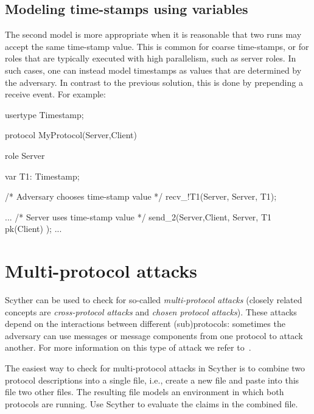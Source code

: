 \documentclass{book}
\begin{document}
\subsection{Modeling time-stamps using variables}

The second model is more appropriate when it is reasonable that two runs
may accept the same time-stamp value. This is common for coarse
time-stamps, or for roles that are typically executed with high
parallelism, such as server roles. In such cases, one can instead model
timestamps as values that are determined by the adversary.
In contrast to the previous solution, this is done by prepending a
receive event. For example:
\begin{spdl}
usertype Timestamp;

protocol MyProtocol(Server,Client) {
  role Server{
    var T1: Timestamp;

    /* Adversary chooses time-stamp value */
    recv_!T1(Server, Server, T1);

    ...
    /* Server uses time-stamp value */
    send_2(Server,Client, { Server, T1 }pk(Client) );
    ...
  }
}
\end{spdl}





\section{Multi-protocol attacks}
\label{sec:pma}

Scyther can be used to check for so-called \emph{multi-protocol attacks} (closely related concepts are \emph{cross-protocol attacks} and \emph{chosen protocol attacks}). These attacks depend on the interactions between different (sub)protocols: sometimes the adversary can use messages or message components from one protocol to attack another. For more information on this type of attack we refer to~\cite{Cr2006multiprotocol,kelsey97protocol}.

The easiest way to check for multi-protocol attacks in Scyther is to combine two protocol descriptions into a single file, i.e., create a new  file and paste into this file two other  files. The resulting file models an environment in which both protocols are running. Use Scyther to evaluate the claims in the combined file. 


\end{document}
